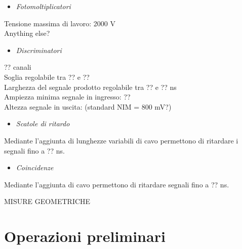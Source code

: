 \documentclass[11pt]{article}
\begin{document}
\begin{flushleft}
\begin{itemize}
\item \textit{Fotomoltiplicatori}
\end{itemize}
Tensione massima di lavoro: 2000 V \\
Anything else?

\begin{itemize}
\item \textit{Discriminatori}
\end{itemize}
?? canali \\
Soglia regolabile tra ?? e ?? \\
Larghezza del segnale prodotto regolabile tra ?? e ?? ns \\
Ampiezza minima segnale in ingresso: ?? \\
Altezza segnale in uscita: (standard NIM = 800 mV?) \\

\begin{itemize}
\item \textit{Scatole di ritardo}
\end{itemize}
Mediante l'aggiunta di lunghezze variabili di cavo permettono di ritardare i segnali fino a ?? ns.

\begin{itemize}
\item \textit{Coincidenze}
\end{itemize}
Mediante l'aggiunta di cavo permettono di ritardare segnali fino a ?? ns.

MISURE GEOMETRICHE

\section{Operazioni preliminari}

\end{flushleft}
\end{document}
